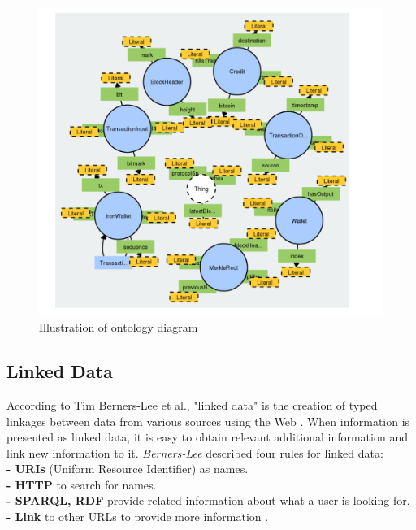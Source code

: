 \begin{center}
	
	
	\begin{figure}[htb!]
		
		\begin{minipage}{0.55\linewidth}
			\centering
			\includegraphics[width=1.65\textwidth]{images/chap02_diagram_ontology.png}
		\end{minipage}
		\caption[Illustration of ontology diagram]{Illustration of ontology diagram \cite{Matthew}}
		
		
	\end{figure}
	
\end{center}
\subsection{Linked Data}
According to Tim Berners-Lee et al., "linked data" is the creation of typed linkages between data from various sources using the Web \cite{Tim}. When information is presented as linked data, it is easy to obtain relevant additional information and link new information to it.
\textit{Berners-Lee} described four rules for linked data:\\
\textbf{- URIs} (Uniform Resource Identifier) as names.\\
\textbf{- HTTP} to search for names.\\
\textbf{- SPARQL, RDF} provide related information about what a user is looking for. \\
\textbf{- Link} to other URLs to provide more information \cite{Hector}.\\

